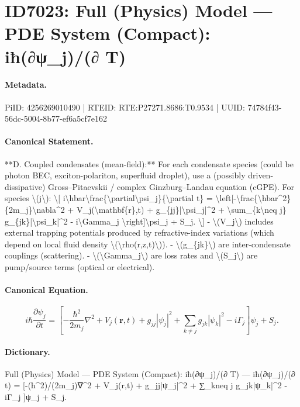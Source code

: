 \section*{ID7023: Full (Physics) Model — PDE System (Compact): iħ(∂ψ\_j)/(∂ T)}
\paragraph{Metadata.}
PiID: 4256269010490 | RTEID: RTE:P27271.8686:T0.9534 | UUID: 74784f43-56dc-5004-8b77-ef6a5cf7e162

\paragraph{Canonical Statement.}
**D. Coupled condensates (mean-field):** For each condensate species (could be photon BEC, exciton-polariton, superfluid droplet), use a (possibly driven-dissipative) Gross–Pitaevskii / complex Ginzburg–Landau equation (cGPE). For species \textbackslash{}(j\textbackslash{}): \textbackslash{}[ i\textbackslash{}hbar\textbackslash{}frac\{\textbackslash{}partial\textbackslash{}psi\_j\}\{\textbackslash{}partial t\} = \textbackslash{}left[-\textbackslash{}frac\{\textbackslash{}hbar\textasciicircum{}2\}\{2m\_j\}\textbackslash{}nabla\textasciicircum{}2 + V\_j(\textbackslash{}mathbf\{r\},t) + g\_\{jj\}|\textbackslash{}psi\_j|\textasciicircum{}2 + \textbackslash{}sum\_\{k\textbackslash{}neq j\} g\_\{jk\}|\textbackslash{}psi\_k|\textasciicircum{}2 - i\textbackslash{}Gamma\_j \textbackslash{}right]\textbackslash{}psi\_j + S\_j. \textbackslash{}] - \textbackslash{}(V\_j\textbackslash{}) includes external trapping potentials produced by refractive-index variations (which depend on local fluid density \textbackslash{}(\textbackslash{}rho(r,z,t)\textbackslash{})). - \textbackslash{}(g\_\{jk\}\textbackslash{}) are inter-condensate couplings (scattering). - \textbackslash{}(\textbackslash{}Gamma\_j\textbackslash{}) are loss rates and \textbackslash{}(S\_j\textbackslash{}) are pump/source terms (optical or electrical).

\paragraph{Canonical Equation.}
\[
i\hbar\frac{\partial\psi_j}{\partial t} = \left[-\frac{\hbar^2}{2m_j}\nabla^2 + V_j(\mathbf{r},t) + g_{jj}|\psi_j|^2 + \sum_{k\neq j} g_{jk}|\psi_k|^2 - i\Gamma_j \right]\psi_j + S_j.
\]

\paragraph{Dictionary.}
Full (Physics) Model — PDE System (Compact): iħ(∂ψ\_j)/(∂ T) — iħ(∂ψ\_j)/(∂ t) = [-(ħ\textasciicircum{}2)/(2m\_j)∇\textasciicircum{}2 + V\_j(r,t) + g\_jj|ψ\_j|\textasciicircum{}2 + ∑\_kneq j g\_jk|ψ\_k|\textasciicircum{}2 - iΓ\_j ]ψ\_j + S\_j.

